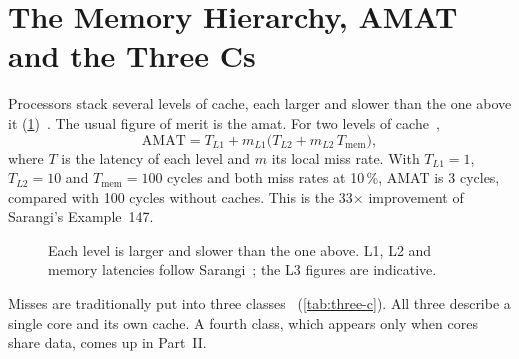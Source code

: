 \section{The Memory Hierarchy, AMAT and the Three Cs}
\label{sec:cache-hierarchy}
\label{sec:cache-3c}
%

Processors stack several levels of cache, each larger and slower than the one
above it (\cref{fig:hierarchy})~\cite[\S11.1.7]{sarangi2025basic}. The usual
figure of merit is the \gls{amat}. For two levels of
cache~\cite[\S11.3.1]{sarangi2025basic},
\begin{equation}
  \mathrm{AMAT} = T_{L1} + m_{L1}\bigl(T_{L2} + m_{L2}\,T_{\mathrm{mem}}\bigr),
  \label{eq:amat}
\end{equation}
where $T$ is the latency of each level and $m$ its local miss rate. With
$T_{L1}=1$, $T_{L2}=10$ and $T_{\mathrm{mem}}=100$ cycles and both miss rates at
10\,\%, AMAT is 3 cycles, compared with 100 cycles without caches. This is the
33$\times$ improvement of Sarangi's Example~147.

\begin{figure}[htbp]
\centering
\begin{bigfig}[0.85]
\end{bigfig}
\caption[The memory hierarchy]{Each level is larger and slower than the one
above. L1, L2 and memory latencies follow Sarangi~\cite[\S11.1.7]{sarangi2025basic};
the L3 figures are indicative.}
\label{fig:hierarchy}
\end{figure}

Misses are traditionally put into three classes~\cite[\S11.3.2]{sarangi2025basic}
(\cref{tab:three-c}). All three describe a single core and its own cache. A
fourth class, which appears only when cores share data, comes up in Part~II.

